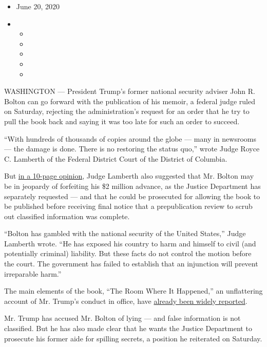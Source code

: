 \begin{itemize}
\item
  June 20, 2020
\item
  \begin{itemize}
  \item
  \item
  \item
  \item
  \item
  \end{itemize}
\end{itemize}

WASHINGTON --- President Trump's former national security adviser John
R. Bolton can go forward with the publication of his memoir, a federal
judge ruled on Saturday, rejecting the administration's request for an
order that he try to pull the book back and saying it was too late for
such an order to succeed.

``With hundreds of thousands of copies around the globe --- many in
newsrooms --- the damage is done. There is no restoring the status
quo,'' wrote Judge Royce C. Lamberth of the Federal District Court of
the District of Columbia.

But
\href{https://pacer-documents.s3.amazonaws.com/36/219024/04517891261.pdf}{in
a 10-page opinion}, Judge Lamberth also suggested that Mr. Bolton may be
in jeopardy of forfeiting his \$2 million advance, as the Justice
Department has separately requested --- and that he could be prosecuted
for allowing the book to be published before receiving final notice that
a prepublication review to scrub out classified information was
complete.

``Bolton has gambled with the national security of the United States,''
Judge Lamberth wrote. ``He has exposed his country to harm and himself
to civil (and potentially criminal) liability. But these facts do not
control the motion before the court. The government has failed to
establish that an injunction will prevent irreparable harm.''

The main elements of the book, ``The Room Where It Happened,'' an
unflattering account of Mr. Trump's conduct in office, have
\href{https://www.nytimes.com/2020/06/18/us/politics/trump-bolton.html}{already
been widely reported}.

Mr. Trump has accused Mr. Bolton of lying --- and false information is
not classified. But he has also made clear that he wants the Justice
Department to prosecute his former aide for spilling secrets, a position
he reiterated on Saturday.

